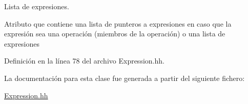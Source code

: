 Lista de expresiones. 

Atributo que contiene una lista de punteros a expresiones en caso que la expresión sea una operación (miembros de la operación) o una lista de expresiones 

Definición en la línea 78 del archivo Expression.\+hh.



La documentación para esta clase fue generada a partir del siguiente fichero\+:\begin{DoxyCompactItemize}
\item 
\hyperlink{_expression_8hh}{Expression.\+hh}\end{DoxyCompactItemize}

